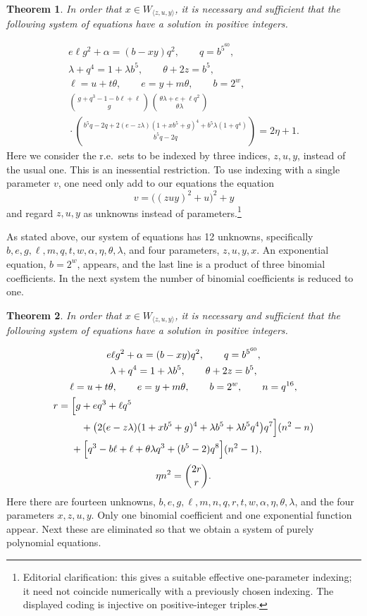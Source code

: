 \documentclass[11pt,letterpaper]{article}
\newcommand{\origpage}[1]{\marginnote{\footnotesize\textbf{[#1]}}}
\newtheorem{theorem}{Theorem}
\begin{document}
\begin{theorem}
In order that $x\in W_{\langle z,u,y\rangle}$, it is necessary and
sufficient that the following system of equations have a solution in
positive integers.
\end{theorem}
\[
\begin{gathered}
 e\ell g^2+\alpha=(b-xy)q^2,\qquad q=b^{5^{60}},\\
 \lambda+q^4=1+\lambda b^5,\qquad \theta+2z=b^5,\\
 \ell=u+t\theta,\qquad e=y+m\theta,\qquad b=2^w,\\[2pt]
 \binom{g+q^3-1-b\ell+\ell}{g}
 \binom{\theta\lambda+e+\ell q^2}{\theta\lambda}\\[2pt]
 {}\cdot
 \binom{b^5q-2q+2(e-z\lambda)(1+xb^5+g)^4+b^5\lambda(1+q^4)}{b^5q-2q}
 =2\eta+1.
\end{gathered}
\]
Here we consider the r.e.\ sets to be indexed by three indices, $z,u,y$,
instead of the usual one. This is an inessential restriction. To use
indexing with a single parameter $v$, one need only add to our equations
the equation
\[
 v=\bigl((zuy)^2+u\bigr)^2+y
\]
and regard $z,u,y$ as unknowns instead of parameters.\footnote{Editorial
clarification: this gives a suitable effective one-parameter indexing;
it need not coincide numerically with a previously chosen indexing.
The displayed coding is injective on positive-integer triples.}

As stated above, our system of equations has 12 unknowns, specifically
$b,e,g,\ell,m,q,t,w,\alpha,\eta,\theta,\lambda$, and four parameters,
$z,u,y,x$. An exponential equation, $b=2^w$, appears, and the last line
is a product of three binomial coefficients. In the next system the
number of binomial coefficients is reduced to one.

\begin{theorem}
In order that $x\in W_{\langle z,u,y\rangle}$, it is necessary and
sufficient that the following system of equations have a solution in
positive integers.
\end{theorem}
\[
\begin{gathered}
 e\ell g^2+\alpha=(b-xy)q^2,\qquad q=b^{5^{60}},\\
 \lambda+q^4=1+\lambda b^5,\qquad \theta+2z=b^5,\\
 \ell=u+t\theta,\qquad e=y+m\theta,\qquad b=2^w,\qquad n=q^{16},\\
\begin{aligned}
 r={}&\Bigl[g+eq^3+\ell q^5\\
     &\quad+\bigl(2(e-z\lambda)(1+xb^5+g)^4
                   +\lambda b^5+\lambda b^5q^4\bigr)q^7\Bigr](n^2-n)\\
     &+\Bigl[q^3-b\ell+\ell+\theta\lambda q^3+(b^5-2)q^8\Bigr](n^2-1),
\end{aligned}\\[2pt]
 \eta n^2=\binom{2r}{r}.
\end{gathered}
\]
Here there are fourteen unknowns,
$b,e,g,\ell,m,n,q,r,t,w,\alpha,\eta,\theta,\lambda$, and the four parameters
$x,z,u,y$. Only one binomial coefficient and one exponential\origpage{861} function
appear. Next these are eliminated so that we obtain a system of purely
polynomial equations.
\end{document}
